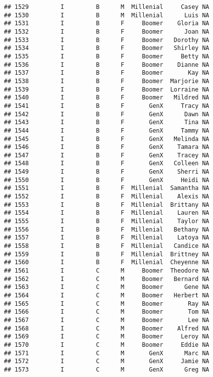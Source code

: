 \documentclass[
]{article}
\begin{document}
\begin{verbatim}
## 1529         I         B      M  Millenial     Casey NA
## 1530         I         B      M  Millenial      Luis NA
## 1531         I         B      F     Boomer    Gloria NA
## 1532         I         B      F     Boomer      Joan NA
## 1533         I         B      F     Boomer   Dorothy NA
## 1534         I         B      F     Boomer   Shirley NA
## 1535         I         B      F     Boomer     Betty NA
## 1536         I         B      F     Boomer    Dianne NA
## 1537         I         B      F     Boomer       Kay NA
## 1538         I         B      F     Boomer  Marjorie NA
## 1539         I         B      F     Boomer  Lorraine NA
## 1540         I         B      F     Boomer   Mildred NA
## 1541         I         B      F       GenX     Tracy NA
## 1542         I         B      F       GenX      Dawn NA
## 1543         I         B      F       GenX      Tina NA
## 1544         I         B      F       GenX     Tammy NA
## 1545         I         B      F       GenX   Melinda NA
## 1546         I         B      F       GenX    Tamara NA
## 1547         I         B      F       GenX    Tracey NA
## 1548         I         B      F       GenX   Colleen NA
## 1549         I         B      F       GenX    Sherri NA
## 1550         I         B      F       GenX     Heidi NA
## 1551         I         B      F  Millenial  Samantha NA
## 1552         I         B      F  Millenial    Alexis NA
## 1553         I         B      F  Millenial  Brittany NA
## 1554         I         B      F  Millenial    Lauren NA
## 1555         I         B      F  Millenial    Taylor NA
## 1556         I         B      F  Millenial   Bethany NA
## 1557         I         B      F  Millenial    Latoya NA
## 1558         I         B      F  Millenial   Candice NA
## 1559         I         B      F  Millenial  Brittney NA
## 1560         I         B      F  Millenial  Cheyenne NA
## 1561         I         C      M     Boomer  Theodore NA
## 1562         I         C      M     Boomer   Bernard NA
## 1563         I         C      M     Boomer      Gene NA
## 1564         I         C      M     Boomer   Herbert NA
## 1565         I         C      M     Boomer       Ray NA
## 1566         I         C      M     Boomer       Tom NA
## 1567         I         C      M     Boomer       Lee NA
## 1568         I         C      M     Boomer    Alfred NA
## 1569         I         C      M     Boomer     Leroy NA
## 1570         I         C      M     Boomer     Eddie NA
## 1571         I         C      M       GenX      Marc NA
## 1572         I         C      M       GenX     Jamie NA
## 1573         I         C      M       GenX      Greg NA

\end{verbatim}
\end{document}
